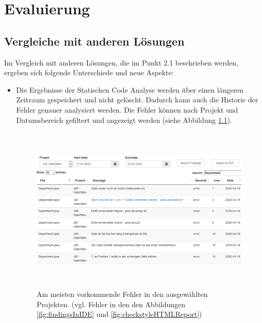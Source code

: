 \chapter{Evaluierung}
\section{Vergleiche mit anderen Lösungen} 
Im Vergleich mit anderen Lösungen, die im Punkt 2.1 beschrieben werden, ergeben sich folgende Unterschiede und neue Aspekte: 
\begin{itemize}
\item Die Ergebnisse der Statischen Code Analyse werden über einen längeren Zeitraum gespeichert und nicht gelöscht. Dadurch kann auch die Historie der Fehler genauer analysiert werden. Die Fehler können nach Projekt und Datumsbereich gefiltert und angezeigt werden (siehe Abbildung \ref{fig:tableRec}).

\begin{figure}[tp]
  \centering
  \includegraphics[height=8cm]{images/tableRec.PNG}
 \caption[Am häufigsten vorkommende Fehler in den ausgewählten Projekten.]{Am meisten vorkommende Fehler in den ausgewählten Projekten. (vgl. Fehler in den den Abbildungen \ref{fig:findingsInIDE} und \ref{fig:checkstyleHTMLReport})}
  \label{fig:tableRec}
\end{figure}


\end{itemize}
